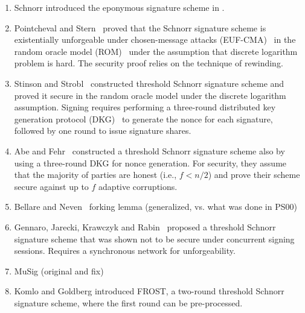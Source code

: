 \begin{enumerate}
\item Schnorr introduced the eponymous signature scheme in \cite{Schnorr91}. 
\item Pointcheval and Stern~\cite{PointchevalS00} proved that the Schnorr signature scheme is existentially unforgeable under chosen-message attacks (EUF-CMA)~\cite{GoldwasserMR88} in the random oracle model (ROM)~\cite{BellareR93} under the assumption that discrete logarithm problem is hard. The security proof relies on the technique of rewinding.~
\item Stinson and Strobl~\cite{StinsonS01} constructed  threshold Schnorr signature scheme and proved it secure in the random oracle model under the discrete logarithm assumption. Signing requires performing a three-round distributed key generation protocol (DKG)~\cite{GennaroJKR07}  to generate the nonce for each signature, followed by one round to issue signature shares. 
\item Abe and Fehr~\cite{AbeF04} constructed a threshold Schnorr signature scheme also by using a three-round DKG for nonce generation.
For security, they assume that the majority of parties are honest (i.e., $f < n/2$) and prove their scheme secure against up to $f$ adaptive corruptions. 
\item Bellare and Neven~\cite{BellareN06} forking lemma (generalized, vs. what was done in PS00)
\item Gennaro, Jarecki, Krawczyk and Rabin~\cite{GennaroJKR01}  proposed a threshold Schnorr signature scheme that was shown not to be secure under concurrent signing sessions.  Requires a synchronous network for unforgeability.
\item MuSig (original and fix)
\item Komlo and Goldberg introduced FROST, a two-round threshold Schnorr signature scheme, where the first round can be pre-processed. 

\end{enumerate}
